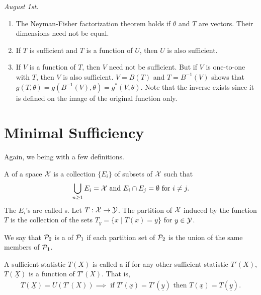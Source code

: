 \textit{August 1st.}

\begin{remark}
    \begin{enumerate}
        \item The Neyman-Fisher factorization theorem holds if $\underline{\theta}$ and $\underline{T}$ are vectors. Their dimensions need not be equal.
        
        \item If $T$ is sufficient and $T$ is a function of $U$, then $U$ is also sufficient.
        
        \item If $V$ is a function of $T$, then $V$ need not be sufficient. But if $V$ is one-to-one with $T$, then $V$ is also sufficient. $V = B(T)$ and $T = B^{-1}(V)$ shows that $g(T,\theta) = g(B^{-1}(V),\theta) = g^{\ast}(V,\theta)$. Note that the inverse exists since it is defined on the image of the original function only.
    \end{enumerate}
\end{remark}

\section{Minimal Sufficiency}
Again, we being with a few definitions.
\begin{definition}
    A  of a space $\mathcal{X}$ is a collection $\{E_{i}\}$ of subsets of $\mathcal{X}$ such that
    \begin{align}
        \bigcup_{n \geq 1} E_{i} = \mathcal{X} \text{ and } E_{i} \cap E_{j} = \emptyset \text{ for } i \neq j.
    \end{align}
    The $E_{i}$'s are called s. Let $T: \mathcal{X} \to \mathcal{Y}$. The partition of $\mathcal{X}$ induced by the function $T$ is the collection of the sets $T_{y} = \{x \mid T(x) = y\}$ for $y \in \mathcal{Y}$.
\end{definition}

We say that $\mathcal{P}_{2}$ is a  of $\mathcal{P}_{1}$ if each partition set of $\mathcal{P}_{2}$ is the union of the same members of $\mathcal{P}_{1}$.

\begin{definition}
    A sufficient statistic $T(X)$ is called a  if for any other sufficient statistic $T'(X)$, $T(\underline{X})$ is a function of $T'(X)$. That is,
    \begin{align}
        T(\underline{X}) = U(T'(X)) \implies \text{ if } T'(\underline{x}) = T'(\underline{y}) \text{ then } T(\underline{x}) = T(\underline{y}).
    \end{align}
\end{definition}

